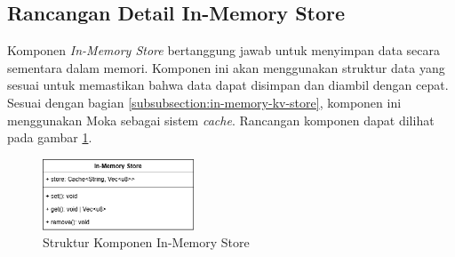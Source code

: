 \subsection{Rancangan Detail In-Memory Store}
\label{subsection:detail-in-memory-store}

Komponen \textit{In-Memory Store} bertanggung jawab untuk menyimpan data secara sementara dalam memori. Komponen ini akan menggunakan struktur data yang sesuai untuk memastikan bahwa data dapat disimpan dan diambil dengan cepat. Sesuai dengan bagian \ref{subsubsection:in-memory-kv-store}, komponen ini menggunakan Moka sebagai sistem \textit{cache}. Rancangan komponen dapat dilihat pada gambar \ref{fig:in-memory-store-component}.

\begin{figure}[ht]
    \centering
    \includegraphics[width=0.4\textwidth]{resources/chapter-3/in-memory-store-component.png}
    \caption{Struktur Komponen In-Memory Store}
    \label{fig:in-memory-store-component}
\end{figure}